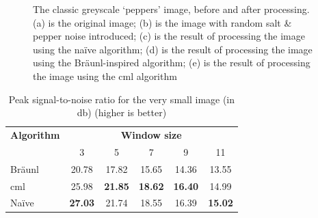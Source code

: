 \begin{figure}
\caption[The classic grayscale `peppers' image, before and after processing]{\label{fig:median:peppers}The classic greyscale `peppers' image, before and after processing.  (a) is the original image; (b) is the image with random salt \& pepper noise introduced; (c) is the result of processing the image using the naïve algorithm; (d) is the result of processing the image using the Br\"{a}unl-inspired algorithm; (e) is the result of processing the image using the \gls{cml} algorithm}
\end{figure}

\begin{table}
\centering
\caption[Peak signal-to-noise for the very small image]{Peak signal-to-noise ratio for the very small image (in \unit{\decibel}) (higher is better)}
\label{tab:median:psnrvsmall}
\begin{tabular}{@{}lccccc@{}}
\toprule
\multicolumn{1}{c}{\textbf{Algorithm}} & \multicolumn{5}{c}{\textbf{Window size}}                                          \\
                                       & 3              & 5              & 7              & 9             & 11             \\ \midrule
Bräunl                                 & 20.78          & 17.82          & 15.65          & 14.36         & 13.55          \\
\gls{cml}                                    & 25.98          & \textbf{21.85} & \textbf{18.62} & \textbf{16.40} & 14.99          \\
Naïve                                  & \textbf{27.03} & 21.74          & 18.55          & 16.39         & \textbf{15.02} \\ \bottomrule
\end{tabular}
\end{table}

